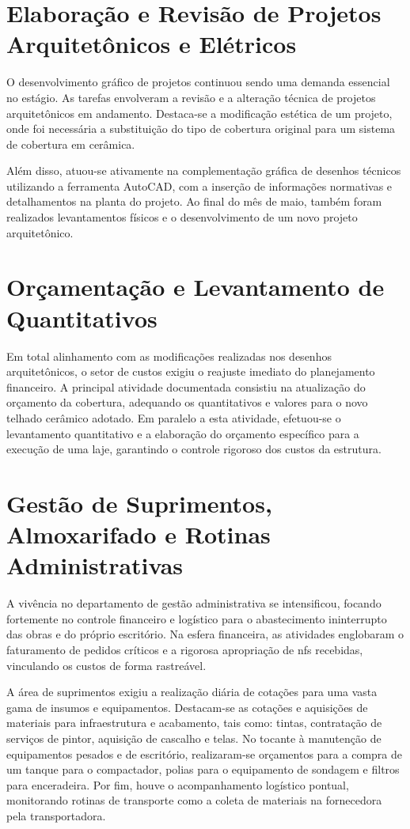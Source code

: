 \section{Elaboração e Revisão de Projetos Arquitetônicos e Elétricos}

O desenvolvimento gráfico de projetos continuou sendo uma demanda essencial no estágio. As tarefas envolveram a revisão e a alteração técnica de projetos arquitetônicos em andamento. Destaca-se a modificação estética de um projeto, onde foi necessária a substituição do tipo de cobertura original para um sistema de cobertura em cerâmica. 

Além disso, atuou-se ativamente na complementação gráfica de desenhos técnicos utilizando a ferramenta AutoCAD, com a inserção de informações normativas e detalhamentos na planta do projeto. Ao final do mês de maio, também foram realizados levantamentos físicos e o desenvolvimento de um novo projeto arquitetônico.

\section{Orçamentação e Levantamento de Quantitativos}

Em total alinhamento com as modificações realizadas nos desenhos arquitetônicos, o setor de custos exigiu o reajuste imediato do planejamento financeiro. A principal atividade documentada consistiu na atualização do orçamento da cobertura, adequando os quantitativos e valores para o novo telhado cerâmico adotado. Em paralelo a esta atividade, efetuou-se o levantamento quantitativo e a elaboração do orçamento específico para a execução de uma laje, garantindo o controle rigoroso dos custos da estrutura.

\section{Gestão de Suprimentos, Almoxarifado e Rotinas Administrativas}

A vivência no departamento de gestão administrativa se intensificou, focando fortemente no controle financeiro e logístico para o abastecimento ininterrupto das obras e do próprio escritório. Na esfera financeira, as atividades englobaram o faturamento de pedidos críticos e a rigorosa apropriação de \gls{nfs} recebidas, vinculando os custos de forma rastreável. 

A área de suprimentos exigiu a realização diária de cotações para uma vasta gama de insumos e equipamentos. Destacam-se as cotações e aquisições de materiais para infraestrutura e acabamento, tais como: tintas, contratação de serviços de pintor, aquisição de cascalho e telas. No tocante à manutenção de equipamentos pesados e de escritório, realizaram-se orçamentos para a compra de um tanque para o compactador, polias para o equipamento de sondagem e filtros para enceradeira. Por fim, houve o acompanhamento logístico pontual, monitorando rotinas de transporte como a coleta de materiais na fornecedora pela transportadora.